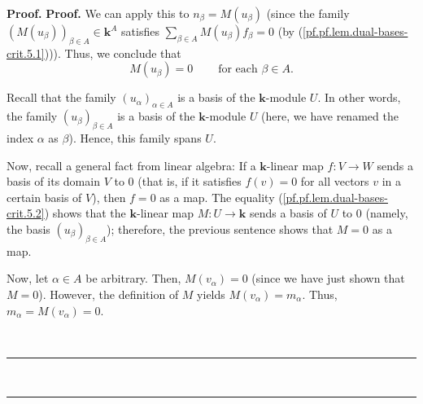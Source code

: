 \documentclass[numbers=enddot,12pt,final,onecolumn,notitlepage]{scrartcl}%
\theoremstyle{definition}
\newenvironment{proof}[1][Proof]{\noindent\textbf{#1.} }{\ \rule{0.5em}{0.5em}}
\let\sumnonlimits\sum
\renewcommand{\sum}{\sumnonlimits\limits}
\newenvironment{vershort}{}{}
\begin{document}
\begin{proof}
\begin{proof}
We can apply this to $n_{\beta}=M\left(  u_{\beta}\right)  $ (since the family
$\left(  M\left(  u_{\beta}\right)  \right)  _{\beta\in A}\in\mathbf{k}^{A}$
satisfies $\sum_{\beta\in A}M\left(  u_{\beta}\right)  f_{\beta}=0$ (by
(\ref{pf.pf.lem.dual-bases-crit.5.1}))). Thus, we conclude that%
\begin{equation}
M\left(  u_{\beta}\right)  =0\ \ \ \ \ \ \ \ \ \ \text{for each }\beta\in A.
\label{pf.pf.lem.dual-bases-crit.5.2}%
\end{equation}


Recall that the family $\left(  u_{\alpha}\right)  _{\alpha\in A}$ is a basis
of the $\mathbf{k}$-module $U$. In other words, the family $\left(  u_{\beta
}\right)  _{\beta\in A}$ is a basis of the $\mathbf{k}$-module $U$ (here, we
have renamed the index $\alpha$ as $\beta$). Hence, this family spans $U$.

\begin{vershort}
Now, recall a general fact from linear algebra: If a $\mathbf{k}$-linear map
$f:V\rightarrow W$ sends a basis of its domain $V$ to $0$ (that is, if it
satisfies $f\left(  v\right)  =0$ for all vectors $v$ in a certain basis of
$V$), then $f=0$ as a map. The equality (\ref{pf.pf.lem.dual-bases-crit.5.2})
shows that the $\mathbf{k}$-linear map $M:U\rightarrow\mathbf{k}$ sends a
basis of $U$ to $0$ (namely, the basis $\left(  u_{\beta}\right)  _{\beta\in
A}$); therefore, the previous sentence shows that $M=0$ as a map.

Now, let $\alpha\in A$ be arbitrary. Then, $M\left(  v_{\alpha}\right)  =0$
(since we have just shown that $M=0$). However, the definition of $M$ yields
$M\left(  v_{\alpha}\right)  =m_{\alpha}$. Thus, $m_{\alpha}=M\left(
v_{\alpha}\right)  =0$.
\end{vershort}


\end{proof}
\end{proof}
\end{document}
